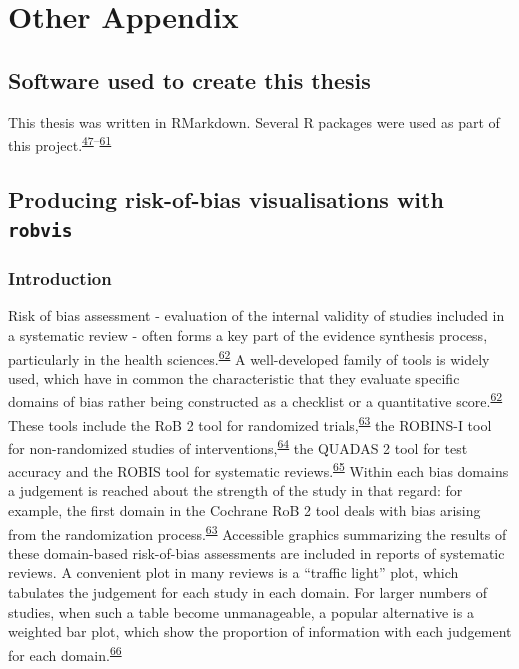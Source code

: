 \documentclass[a4paper, twoside]{templates/ociamthesis}
\begin{document}
\hypertarget{other-appendix-heading}{%
\chapter{Other Appendix}\label{other-appendix-heading}}

\hypertarget{software-used-to-create-this-thesis}{%
\section{Software used to create this thesis}\label{software-used-to-create-this-thesis}}

This thesis was written in RMarkdown.
Several R packages were used as part of this project.\textsuperscript{\protect\hyperlink{ref-base}{47}--\protect\hyperlink{ref-xfun}{61}}

\hypertarget{appendix-robvis}{%
\section{\texorpdfstring{Producing risk-of-bias visualisations with \texttt{robvis}}{Producing risk-of-bias visualisations with robvis}}\label{appendix-robvis}}

\hypertarget{introduction-1}{%
\subsection{Introduction}\label{introduction-1}}

Risk of bias assessment - evaluation of the internal validity of studies included in a systematic review - often forms a key part of the evidence synthesis process, particularly in the health sciences.\textsuperscript{\protect\hyperlink{ref-cochranechpt7}{62}} A well-developed family of tools is widely used, which have in common the characteristic that they evaluate specific domains of bias rather being constructed as a checklist or a quantitative score.\textsuperscript{\protect\hyperlink{ref-cochranechpt7}{62}} These tools include the RoB 2 tool for randomized trials,\textsuperscript{\protect\hyperlink{ref-sterne2019rob}{63}} the ROBINS-I tool for non-randomized studies of interventions,\textsuperscript{\protect\hyperlink{ref-sterne2016robins}{64}} the QUADAS 2 tool for test accuracy and the ROBIS tool for systematic reviews.\textsuperscript{\protect\hyperlink{ref-whiting2011quadas}{65}} Within each bias domains a judgement is reached about the strength of the study in that regard: for example, the first domain in the Cochrane RoB 2 tool deals with bias arising from the randomization process.\textsuperscript{\protect\hyperlink{ref-sterne2019rob}{63}} Accessible graphics summarizing the results of these domain-based risk-of-bias assessments are included in reports of systematic reviews. A convenient plot in many reviews is a ``traffic light'' plot, which tabulates the judgement for each study in each domain. For larger numbers of studies, when such a table become unmanageable, a popular alternative is a weighted bar plot, which show the proportion of information with each judgement for each domain.\textsuperscript{\protect\hyperlink{ref-higgins2008assessing}{66}}
\end{document}
